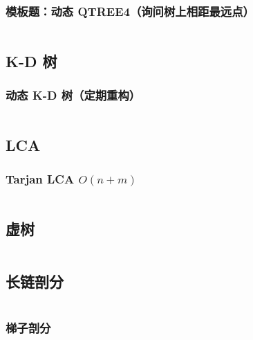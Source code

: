 \documentclass[a4paper, twoside]{article}
\begin{document}
\begin{multicols}{2}
				\subsubsection[模板题：动态QTREE4]{模板题：动态 QTREE4（询问树上相距最远点）}
						\inputminted{cpp}{../src/datastructure/动态QTREE4.cpp}
	
			\subsection{K-D 树}

				\subsubsection{动态 K-D 树（定期重构）}
					\inputminted{cpp}{../src/datastructure/动态KD树.cpp}
	
	
	
			
			\subsection[LCA 最近公共祖先]{LCA}
				\subsubsection{Tarjan LCA $O(n + m)$}
					\inputminted{cpp}{../src/datastructure/tarjanlca.cpp}

			\subsection{虚树}
				\inputminted{cpp}{../src/datastructure/虚树.cpp}
	
			\subsection{长链剖分}
				\inputminted{cpp}{../src/datastructure/长链剖分.cpp}
	
				\subsubsection{梯子剖分}
					\inputminted{cpp}{../src/datastructure/梯子剖分.cpp}
			

\end{multicols}
\end{document}
